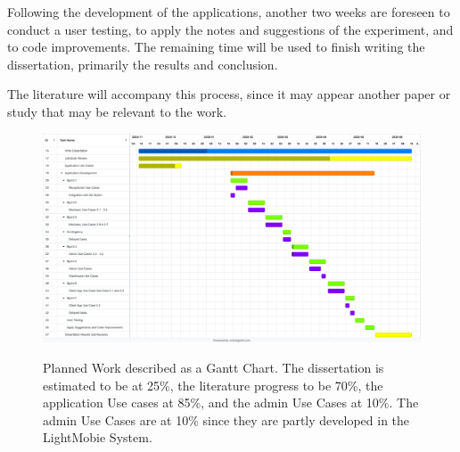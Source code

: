  Following the development of the applications, another two weeks are foreseen to conduct a user testing, to apply the notes and suggestions of the experiment, and to code improvements.
 The remaining time will be used to finish writing the dissertation, primarily the results and conclusion.
  
 The literature will accompany this process, since it may appear another paper or study that may be relevant to the work.


    \begin{figure}[h]
      \caption{Planned Work described as a Gantt Chart. The dissertation is estimated to be at 25\%, the literature progress to be 70\%, the application Use cases at 85\%, and the admin Use Cases at 10\%. The admin Use Cases are at 10\% since they are partly developed in the LightMobie System.}
      \centering
      \includegraphics[width=\textwidth]{figs/Gantt}
      \label{fig:figure1}
    \end{figure}
